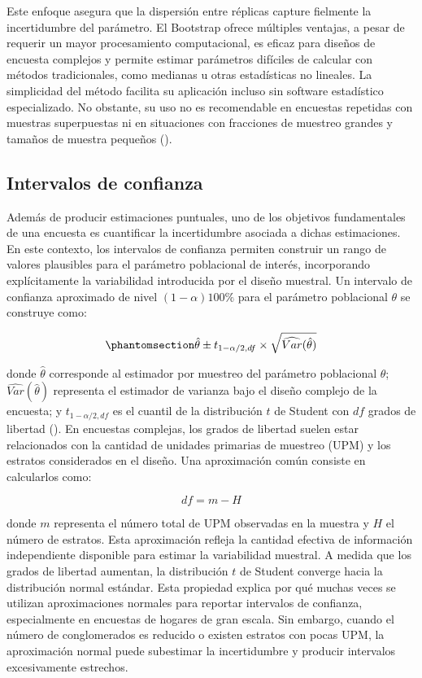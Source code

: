 \documentclass[
  spanish,
  11pt,
  letterpaper,
  oneside,
  open=any]{scrbook}
\begin{document}
Este enfoque asegura que la dispersión entre réplicas capture fielmente
la incertidumbre del parámetro. El Bootstrap ofrece múltiples ventajas,
a pesar de requerir un mayor procesamiento computacional, es eficaz para
diseños de encuesta complejos y permite estimar parámetros difíciles de
calcular con métodos tradicionales, como medianas u otras estadísticas
no lineales. La simplicidad del método facilita su aplicación incluso
sin software estadístico especializado. No obstante, su uso no es
recomendable en encuestas repetidas con muestras superpuestas ni en
situaciones con fracciones de muestreo grandes y tamaños de muestra
pequeños ().

\subsection{Intervalos de confianza}\label{intervalos-de-confianza}

Además de producir estimaciones puntuales, uno de los objetivos
fundamentales de una encuesta es cuantificar la incertidumbre asociada a
dichas estimaciones. En este contexto, los intervalos de confianza
permiten construir un rango de valores plausibles para el parámetro
poblacional de interés, incorporando explícitamente la variabilidad
introducida por el diseño muestral. Un intervalo de confianza aproximado
de nivel \((1-\alpha)100\%\) para el parámetro poblacional \(\theta\) se
construye como:

\begin{equation}\protect\phantomsection\label{eq-intervalo-confianza-general}{\hat{\theta} \pm t_{1-\alpha/2, df} \times \sqrt{\widehat{Var}(\hat{\theta})}}\end{equation}

donde \(\hat{\theta}\) corresponde al estimador por muestreo del
parámetro poblacional \(\theta\); \(\widehat{Var}(\hat{\theta})\)
representa el estimador de varianza bajo el diseño complejo de la
encuesta; y \(t_{1-\alpha/2, df}\) es el cuantil de la distribución
\(t\) de Student con \(df\) grados de libertad
(). En encuestas complejas, los
grados de libertad suelen estar relacionados con la cantidad de unidades
primarias de muestreo (UPM) y los estratos considerados en el diseño.
Una aproximación común consiste en calcularlos como:

\[df = m - H\]

donde \(m\) representa el número total de UPM observadas en la muestra y
\(H\) el número de estratos. Esta aproximación refleja la cantidad
efectiva de información independiente disponible para estimar la
variabilidad muestral. A medida que los grados de libertad aumentan, la
distribución \(t\) de Student converge hacia la distribución normal
estándar. Esta propiedad explica por qué muchas veces se utilizan
aproximaciones normales para reportar intervalos de confianza,
especialmente en encuestas de hogares de gran escala. Sin embargo,
cuando el número de conglomerados es reducido o existen estratos con
pocas UPM, la aproximación normal puede subestimar la incertidumbre y
producir intervalos excesivamente estrechos.
\end{document}
